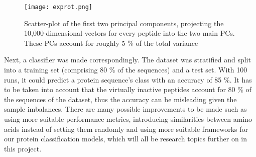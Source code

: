 \begin{figure}[h!]
    \centering
    \texttt{[image: exprot.png]}
    \caption{Scatter-plot of the first two principal components, projecting the 10,000-dimensional vectors for every peptide into the two main PCs. These PCs account for roughly 5 \% of the total variance}
    \label{fig:diagram_exprot}
\end{figure}

Next, a classifier was made correspondingly. The dataset was stratified and split into a training set (comprising 80 \% of the sequences) and a test set. With 100 runs, it could predict a protein sequence's class with an accuracy of 85 \%. It has to be taken into account that the virtually inactive peptides account for 80 \% of the sequences of the dataset, thus the accuracy can be misleading given the sample imbalances. There are many possible improvements to be made such as using more suitable performance metrics, introducing similarities between amino acids instead of setting them randomly and using more suitable frameworks for our protein classification models, which will all be research topics further on in this project.